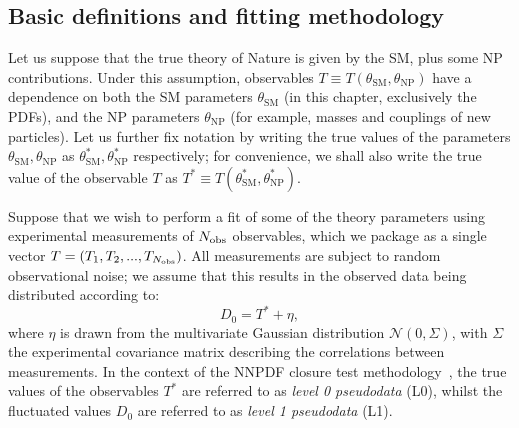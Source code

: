 \documentclass[withindex,glossary]{cam-thesis}
\begin{document}
\subsection{Basic definitions and fitting methodology}
\label{subsec:contamination_definition}
Let us suppose that the true theory of Nature is given by the SM, plus some NP contributions. 
Under this assumption, observables $T \equiv T(\theta_{\text{SM}}, \theta_{\text{NP}})$ have a dependence on both the SM 
parameters $\theta_{\text{SM}}$ (in this chapter, exclusively the PDFs), and the NP parameters $\theta_{\text{NP}}$ 
(for example, masses and couplings of new particles). Let us further fix notation by writing the true values of the 
parameters $\theta_{\text{SM}}, \theta_{\text{NP}}$ as $\theta_{\text{SM}}^*, \theta_{\text{NP}}^*$ respectively; 
for convenience, we shall also write the true value of the observable $T$ as $T^* \equiv T(\theta_{\text{SM}}^*, \theta_{\text{NP}}^*)$.

Suppose that we wish to perform a fit of some of the theory parameters using experimental measurements of $N_{\rm obs}$ observables, which we package as a single vector $T = (T_1, T_2,..., T_{N_{\rm obs}})$. All measurements are subject to random observational noise; we assume that this results in the observed data being distributed according to:
\begin{equation}
\label{eq:observed_data}
D_0 = T^* + \eta,
\end{equation}
where $\eta$ is drawn from the multivariate Gaussian distribution $\mathcal{N}(0,\Sigma)$, with $\Sigma$ the experimental covariance matrix describing the correlations between measurements. In the context of the NNPDF closure test methodology~\cite{NNPDF:2014otw}, the true values of the observables $T^*$ are referred to as \textit{level 0 pseudodata} (L0), whilst the fluctuated values $D_0$ are referred to as \textit{level 1 pseudodata} (L1).
\end{document}
